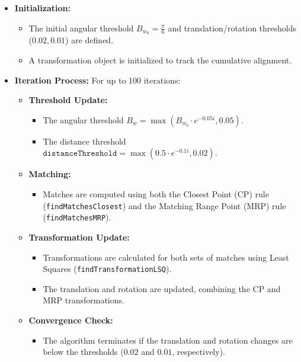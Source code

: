 \documentclass[template,12pt,a4paper,enabledeprecatedfontcommands]{template}
\begin{document}
\begin{itemize}
    \item \textbf{Initialization:}
    \begin{itemize}
        \item The initial angular threshold \(B_{w_0} = \frac{\pi}{6}\) and translation/rotation thresholds (\(0.02, 0.01\)) are defined.
        \item A transformation object is initialized to track the cumulative alignment.
    \end{itemize}
    
    \item \textbf{Iteration Process:}
    For up to 100 iterations:
    \begin{itemize}
        \item \textbf{Threshold Update:}
        \begin{itemize}
            \item The angular threshold \(B_w = \max(B_{w_0} \cdot e^{-0.05i}, 0.05)\).
            \item The distance threshold \(\texttt{distanceThreshold} = \max(0.5 \cdot e^{-0.1i}, 0.02)\).
        \end{itemize}
        \item \textbf{Matching:}
        \begin{itemize}
            \item Matches are computed using both the Closest Point (CP) rule (\texttt{findMatchesClosest}) and the Matching Range Point (MRP) rule (\texttt{findMatchesMRP}).
        \end{itemize}
        \item \textbf{Transformation Update:}
        \begin{itemize}
            \item Transformations are calculated for both sets of matches using Least Squares (\texttt{findTransformationLSQ}).
            \item The translation and rotation are updated, combining the CP and MRP transformations.
        \end{itemize}
        \item \textbf{Convergence Check:}
        \begin{itemize}
            \item The algorithm terminates if the translation and rotation changes are below the thresholds (\(0.02\) and \(0.01\), respectively).
        \end{itemize}
    \end{itemize}
\end{itemize}
\end{document}

